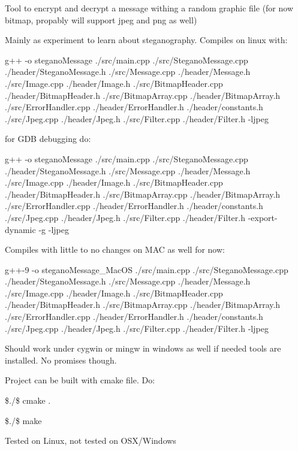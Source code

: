 Tool to encrypt and decrypt a message withing a random graphic file (for now bitmap, propably will support jpeg and png as well)

Mainly as experiment to learn about steganography. Compiles on linux with\+:

g++ -\/o stegano\+Message ./src/main.cpp ./src/\+Stegano\+Message.cpp ./header/\+Stegano\+Message.h ./src/\+Message.cpp ./header/\+Message.h ./src/\+Image.cpp ./header/\+Image.h ./src/\+Bitmap\+Header.cpp ./header/\+Bitmap\+Header.h ./src/\+Bitmap\+Array.cpp ./header/\+Bitmap\+Array.h ./src/\+Error\+Handler.cpp ./header/\+Error\+Handler.h ./header/constants.h ./src/\+Jpeg.cpp ./header/\+Jpeg.h ./src/\+Filter.cpp ./header/\+Filter.h -\/ljpeg

for G\+DB debugging do\+:

g++ -\/o stegano\+Message ./src/main.cpp ./src/\+Stegano\+Message.cpp ./header/\+Stegano\+Message.h ./src/\+Message.cpp ./header/\+Message.h ./src/\+Image.cpp ./header/\+Image.h ./src/\+Bitmap\+Header.cpp ./header/\+Bitmap\+Header.h ./src/\+Bitmap\+Array.cpp ./header/\+Bitmap\+Array.h ./src/\+Error\+Handler.cpp ./header/\+Error\+Handler.h ./header/constants.h ./src/\+Jpeg.cpp ./header/\+Jpeg.h ./src/\+Filter.cpp ./header/\+Filter.h -\/export-\/dynamic -\/g -\/ljpeg

Compiles with little to no changes on M\+AC as well for now\+:

g++-\/9 -\/o stegano\+Message\+\_\+\+Mac\+OS ./src/main.cpp ./src/\+Stegano\+Message.cpp ./header/\+Stegano\+Message.h ./src/\+Message.cpp ./header/\+Message.h ./src/\+Image.cpp ./header/\+Image.h ./src/\+Bitmap\+Header.cpp ./header/\+Bitmap\+Header.h ./src/\+Bitmap\+Array.cpp ./header/\+Bitmap\+Array.h ./src/\+Error\+Handler.cpp ./header/\+Error\+Handler.h ./header/constants.h ./src/\+Jpeg.cpp ./header/\+Jpeg.h ./src/\+Filter.cpp ./header/\+Filter.h -\/ljpeg

Should work under cygwin or mingw in windows as well if needed tools are installed. No promises though.

Project can be built with cmake file. Do\+:

\$./\$ cmake .

\$./\$ make

Tested on Linux, not tested on O\+S\+X/\+Windows 